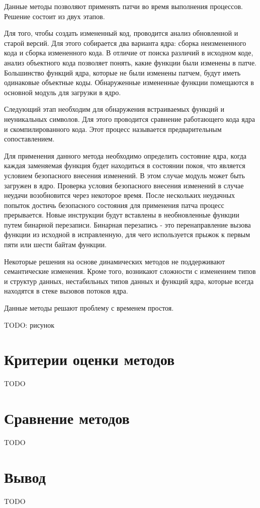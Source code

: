 Данные методы \cite{dynamic} позволяют применять патчи во время выполнения процессов. Решение состоит из двух этапов.

Для того, чтобы создать измененный код, проводится анализ обновленной и старой	версий. Для этого собирается два варианта ядра: сборка неизмененного кода и сборка измененного кода. В отличие от поиска различий в исходном коде, анализ объектного кода позволяет понять, какие функции были изменены в патче. Большинство функций ядра, которые не были изменены патчем, будут иметь одинаковые объектные коды. Обнаруженные измененные функции помещаются в основной модуль для загрузки в ядро.

Следующий этап необходим для обнаружения встраиваемых функций и неуникальных символов. Для этого проводится сравнение работающего кода ядра и скомпилированного кода. Этот процесс называется предварительным сопоставлением.

Для применения данного метода необходимо определить состояние ядра, когда каждая заменяемая функция будет находиться в состоянии покоя, что является условием безопасного внесения изменений. В этом случае модуль может быть загружен в ядро. Проверка условия безопасного внесения изменений в случае неудачи возобновится через некоторое время. После нескольких неудачных попыток достичь безопасного состояния для применения патча процесс прерывается. Новые инструкции будут вставлены в необновленные функции путем бинарной перезаписи. Бинарная перезапись - это перенаправление вызова функции из исходной в исправленную, для чего используется прыжок к первым пяти или шести байтам функции.

Некоторые решения на основе динамических методов не поддерживают семантические изменения. Кроме того, возникают сложности с изменением типов и структур данных, нестабильных типов данных и функций ядра, которые всегда находятся в стеке вызовов потоков ядра.

Данные методы решают проблему с временем простоя.

TODO: рисунок

\section{Критерии оценки методов}

TODO

\section{Сравнение методов}

TODO

\section{Вывод}

TODO
